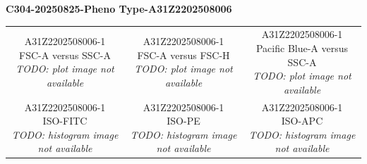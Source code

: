 \documentclass[UTF8,10pt,a4paper,fontset=fandol]{ctexart}
\begin{document}
\newpage

\begin{center}
\textbf{C304-20250825-Pheno Type-A31Z2202508006}
\end{center}

\begin{center}
\begin{tabular}{ccc}
\parbox[c][3.1cm][c]{0.29\linewidth}{\centering
A31Z2202508006-1\\
FSC-A versus SSC-A\\
\textit{TODO: plot image not available}} &
\parbox[c][3.1cm][c]{0.29\linewidth}{\centering
A31Z2202508006-1\\
FSC-A versus FSC-H\\
\textit{TODO: plot image not available}} &
\parbox[c][3.1cm][c]{0.29\linewidth}{\centering
A31Z2202508006-1\\
Pacific Blue-A versus SSC-A\\
\textit{TODO: plot image not available}}
\\[0.5em]
\parbox[c][3.1cm][c]{0.29\linewidth}{\centering
A31Z2202508006-1\\
ISO-FITC\\
\textit{TODO: histogram image not available}} &
\parbox[c][3.1cm][c]{0.29\linewidth}{\centering
A31Z2202508006-1\\
ISO-PE\\
\textit{TODO: histogram image not available}} &
\parbox[c][3.1cm][c]{0.29\linewidth}{\centering
A31Z2202508006-1\\
ISO-APC\\
\textit{TODO: histogram image not available}}
\end{tabular}
\end{center}
\end{document}
